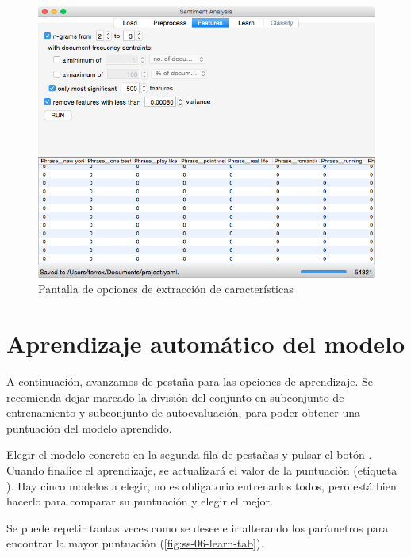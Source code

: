 \begin{figure}[H]
\centering
\includegraphics[width=12cm]{ss-05-feat-tab}
\caption{Pantalla de opciones de extracción de características}
\label{fig:ss-05-feat-tab}
\end{figure}

\section{Aprendizaje automático del modelo}
\label{sec:manual-learn}

A continuación, avanzamos de pestaña para las opciones de aprendizaje. Se recomienda dejar marcado la división del conjunto en subconjunto de entrenamiento y subconjunto de autoevaluación, para poder obtener una puntuación del modelo aprendido.

Elegir el modelo concreto en la segunda fila de pestañas y pulsar el botón . Cuando finalice el aprendizaje, se actualizará el valor de la puntuación (etiqueta ). Hay cinco modelos a elegir, no es obligatorio entrenarlos todos, pero está bien hacerlo para comparar su puntuación y elegir el mejor.

Se puede repetir tantas veces como se desee e ir alterando los parámetros para encontrar la mayor puntuación (\autoref{fig:ss-06-learn-tab}).

